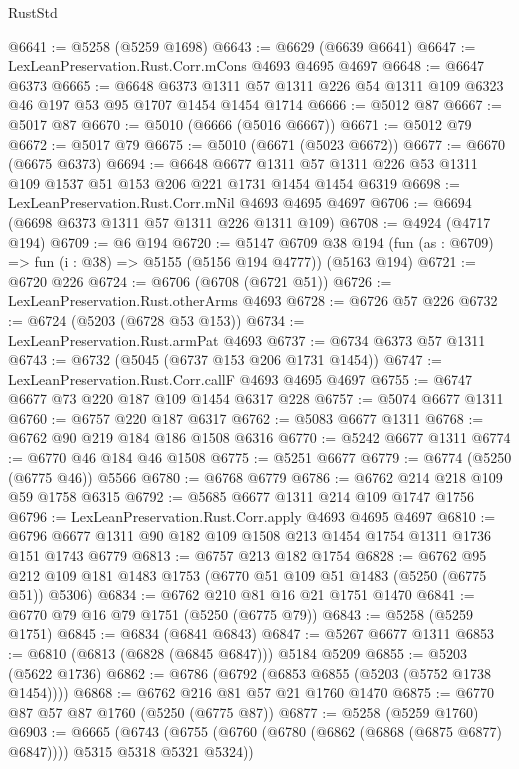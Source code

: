 \begin{lexlean}{RustStd}
\begin{coremodule}
@6641 := @5258 (@5259 @1698)
@6643 := @6629 (@6639 @6641)
@6647 := LexLeanPreservation.Rust.Corr.mCons @4693 @4695 @4697
@6648 := @6647 @6373
@6665 := @6648
    @6373
    @1311
    @57
    @1311
    @226
    @54
    @1311
    @109
    @6323
    @46
    @197
    @53
    @95
    @1707
    @1454
    @1454
    @1714
@6666 := @5012 @87
@6667 := @5017 @87
@6670 := @5010 (@6666 (@5016 @6667))
@6671 := @5012 @79
@6672 := @5017 @79
@6675 := @5010 (@6671 (@5023 @6672))
@6677 := @6670 (@6675 @6373)
@6694 := @6648
    @6677
    @1311
    @57
    @1311
    @226
    @53
    @1311
    @109
    @1537
    @51
    @153
    @206
    @221
    @1731
    @1454
    @1454
    @6319
@6698 := LexLeanPreservation.Rust.Corr.mNil @4693 @4695 @4697
@6706 := @6694 (@6698 @6373 @1311 @57 @1311 @226 @1311 @109)
@6708 := @4924 (@4717 @194)
@6709 := @6 @194
@6720 := @5147
    @6709
    @38
    @194
    (fun (as : @6709) => fun (i : @38) => @5155 (@5156 @194 @4777))
    (@5163 @194)
@6721 := @6720 @226
@6724 := @6706 (@6708 (@6721 @51))
@6726 := LexLeanPreservation.Rust.otherArms @4693
@6728 := @6726 @57 @226
@6732 := @6724 (@5203 (@6728 @53 @153))
@6734 := LexLeanPreservation.Rust.armPat @4693
@6737 := @6734 @6373 @57 @1311
@6743 := @6732 (@5045 (@6737 @153 @206 @1731 @1454))
@6747 := LexLeanPreservation.Rust.Corr.callF @4693 @4695 @4697
@6755 := @6747 @6677 @73 @220 @187 @109 @1454 @6317 @228
@6757 := @5074 @6677 @1311
@6760 := @6757 @220 @187 @6317
@6762 := @5083 @6677 @1311
@6768 := @6762 @90 @219 @184 @186 @1508 @6316
@6770 := @5242 @6677 @1311
@6774 := @6770 @46 @184 @46 @1508
@6775 := @5251 @6677
@6779 := @6774 (@5250 (@6775 @46)) @5566
@6780 := @6768 @6779
@6786 := @6762 @214 @218 @109 @59 @1758 @6315
@6792 := @5685 @6677 @1311 @214 @109 @1747 @1756
@6796 := LexLeanPreservation.Rust.Corr.apply @4693 @4695 @4697
@6810 := @6796 @6677 @1311 @90 @182 @109 @1508 @213 @1454 @1754 @1311 @1736 @151 @1743 @6779
@6813 := @6757 @213 @182 @1754
@6828 := @6762 @95 @212 @109 @181 @1483 @1753 (@6770 @51 @109 @51 @1483 (@5250 (@6775 @51)) @5306)
@6834 := @6762 @210 @81 @16 @21 @1751 @1470
@6841 := @6770 @79 @16 @79 @1751 (@5250 (@6775 @79))
@6843 := @5258 (@5259 @1751)
@6845 := @6834 (@6841 @6843)
@6847 := @5267 @6677 @1311
@6853 := @6810 (@6813 (@6828 (@6845 @6847))) @5184 @5209
@6855 := @5203 (@5622 @1736)
@6862 := @6786 (@6792 (@6853 @6855 (@5203 (@5752 @1738 @1454))))
@6868 := @6762 @216 @81 @57 @21 @1760 @1470
@6875 := @6770 @87 @57 @87 @1760 (@5250 (@6775 @87))
@6877 := @5258 (@5259 @1760)
@6903 := @6665
    (@6743 (@6755 (@6760 (@6780 (@6862 (@6868 (@6875 @6877) @6847)))) @5315 @5318 @5321 @5324))

\end{coremodule}
\end{lexlean}
